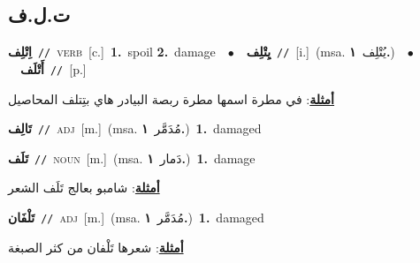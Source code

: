 \documentclass[10pt,a4paper,twoside]{article} %
\begin{document}
\begin{multicols}{2}
{{{{{{{{{{{{{{{{\vspace{-3mm}
\subsection*{\color{blue}\foreignlanguage{arabic}{ت.ل.ف}\color{blue}{}} 

{\setlength\topsep{0pt}\textbf{\foreignlanguage{arabic}{اِتْلِف}}\ {\color{gray}\texttt{//}\color{black}}\ \textsc{verb}\ [c.]\ \textbf{1.}~spoil  \textbf{2.}~damage\ \ $\bullet$\ \ \setlength\topsep{0pt}\textbf{\foreignlanguage{arabic}{يِتْلِف}}\ {\color{gray}\texttt{//}\color{black}}\ [i.]\ \color{gray}(msa. \foreignlanguage{arabic}{يُتْلِف}~\foreignlanguage{arabic}{\textbf{١.}})\color{black}\ \ $\bullet$\ \ \setlength\topsep{0pt}\textbf{\foreignlanguage{arabic}{أَتْلَف}}\ {\color{gray}\texttt{//}\color{black}}\ [p.]\  \begin{flushright}\color{gray}\foreignlanguage{arabic}{\textbf{\underline{\foreignlanguage{arabic}{أمثلة}}}: في مطرة اسمها مطرة ربصة البيادر هاي بتِتلف المحاصيل}\end{flushright}\color{black}} \vspace{2mm}

{\setlength\topsep{0pt}\textbf{\foreignlanguage{arabic}{تَالِف}}\ {\color{gray}\texttt{//}\color{black}}\ \textsc{adj}\ [m.]\ \color{gray}(msa. \foreignlanguage{arabic}{مُدَمَّر}~\foreignlanguage{arabic}{\textbf{١.}})\color{black}\ \textbf{1.}~damaged\ 

{\setlength\topsep{0pt}\textbf{\foreignlanguage{arabic}{تَلَف}}\ {\color{gray}\texttt{//}\color{black}}\ \textsc{noun}\ [m.]\ \color{gray}(msa. \foreignlanguage{arabic}{دَمار}~\foreignlanguage{arabic}{\textbf{١.}})\color{black}\ \textbf{1.}~damage\  \begin{flushright}\color{gray}\foreignlanguage{arabic}{\textbf{\underline{\foreignlanguage{arabic}{أمثلة}}}: شامبو بعالج تَلَف الشعر}\end{flushright}\color{black}} \vspace{2mm}

{\setlength\topsep{0pt}\textbf{\foreignlanguage{arabic}{تَلْفَان}}\ {\color{gray}\texttt{//}\color{black}}\ \textsc{adj}\ [m.]\ \color{gray}(msa. \foreignlanguage{arabic}{مُدَمَّر}~\foreignlanguage{arabic}{\textbf{١.}})\color{black}\ \textbf{1.}~damaged\  \begin{flushright}\color{gray}\foreignlanguage{arabic}{\textbf{\underline{\foreignlanguage{arabic}{أمثلة}}}: شعرها تَلْفان من كثر الصبغة}\end{flushright}\color{black}} \vspace{2mm}

}}}}}}}}}}}}}}}}}
\end{multicols}
\end{document}
